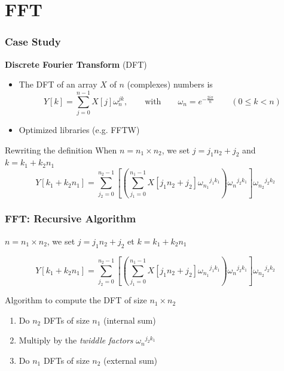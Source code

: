 \documentclass[xcolor={x11names,svgnames}]{beamer}
\begin{document}

\section{FFT}

\begin{frame}
  \frametitle{Case Study}

  \begin{block}{\textbf{Discrete Fourier Transform} (DFT)}
  \begin{itemize}
  \item The DFT of an array $X$ of $n$ (complexes) numbers is
\[
  Y[k] = \sum_{j=0}^{n-1} X[j] \omega_n^{jk}, \qquad \text{with} \qquad \omega_n = e^{-\frac{2i\pi}{n}} \qquad (0 \leq k < n)
\]
\item Optimized libraries (e.g. FFTW)
\end{itemize}
\end{block}

\medskip

\begin{alertblock}{Rewriting the definition}
When $n = n_1 \times n_2$, we set
$j = j_1 n_2 + j_2$ and $k = k_1 + k_2 n_1$ 
\[
Y[k_1 + k_2 n_1] = \sum_{j_2 = 0}^{n_2 - 1} \left[ \left( \sum_{j_1 = 0}^{n_1 - 1} X[j_1n_2 + j_2] {\omega_{n_1}}^{j_1 k_1} \right) {\omega_n}^{j_2 k_1} \right] {\omega_{n_2}}^{j_2 k_2}
\]
\end{alertblock}

\end{frame}


\begin{frame}
  \frametitle{FFT: Recursive Algorithm}

$n = n_1 \times n_2$, we set $j = j_1 n_2 + j_2$ et $k = k_1 + k_2 n_1$ 

\[
Y[k_1 + k_2 n_1] = \sum_{j_2 = 0}^{n_2 - 1} \left[ \left( \sum_{j_1 = 0}^{n_1 - 1} X[j_1n_2 + j_2] {\omega_{n_1}}^{j_1 k_1} \right) {\omega_n}^{j_2 k_1} \right] {\omega_{n_2}}^{j_2 k_2}
\]
  
\begin{block}{Algorithm to compute the DFT of size $n_1 \times n_2$}
  \begin{enumerate}
  \item Do $n_2$ DFTs of size $n_1$ (internal sum)
  \item Multiply by the \emph{twiddle factors} ${\omega_n}^{j_2 k_1}$
  \item Do $n_1$ DFTs of size $n_2$ (external sum)
  \end{enumerate}
\end{block}

\end{frame}
\end{document}
